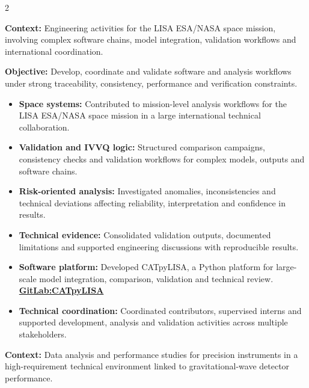 \documentclass[8pt,a4paper,ragged2e,withhyper]{altacv}
\begin{document}
\begin{paracol}{2}
\divider


\textbf{Context:} Engineering activities for the LISA ESA/NASA space mission, involving complex software chains, model integration, validation workflows and international coordination.

\textbf{Objective:} Develop, coordinate and validate software and analysis workflows under strong traceability, consistency, performance and verification constraints.

\begin{itemize}
  \item \textbf{Space systems:} Contributed to mission-level analysis workflows for the LISA ESA/NASA space mission in a large international technical collaboration.
  \item \textbf{Validation and IVVQ logic:} Structured comparison campaigns, consistency checks and validation workflows for complex models, outputs and software chains.
  \item \textbf{Risk-oriented analysis:} Investigated anomalies, inconsistencies and technical deviations affecting reliability, interpretation and confidence in results.
  \item \textbf{Technical evidence:} Consolidated validation outputs, documented limitations and supported engineering discussions with reproducible results.
  \item \textbf{Software platform:} Developed CATpyLISA, a Python platform for large-scale model integration, comparison, validation and technical review.
  \textcolor{DarkPastelRed}{\href{https://gitlab.oca.eu/gboileau/lisa_l3_tools}{\bf GitLab:CATpyLISA}}
  \item \textbf{Technical coordination:} Coordinated contributors, supervised interns and supported development, analysis and validation activities across multiple stakeholders.
\end{itemize}

\divider


\textbf{Context:} Data analysis and performance studies for precision instruments in a high-requirement technical environment linked to gravitational-wave detector performance.


\end{paracol}
\end{document}
